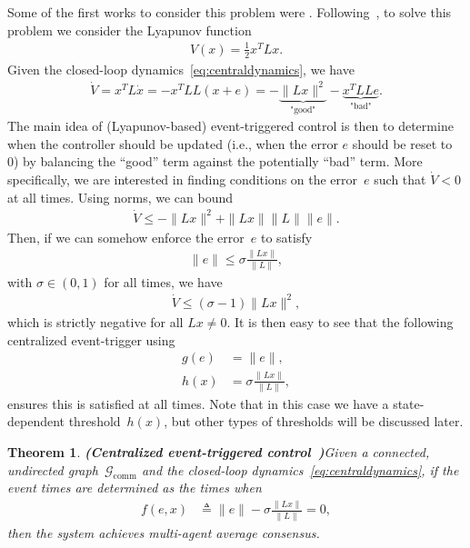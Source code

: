 \documentclass{autart}
\newtheorem{theorem}{Theorem}[section]
\newcommand{\GG}{{\mathcal{G}}}
\newcommand{\commgraph}{\GG_\text{comm}}
\newcommand{\TwoNorm}[1]{\|#1\|}
\newcommand{\longthmtitle}[1]{\mbox{}\textup{\textbf{(#1)}}}
\begin{document}
Some of the first works to consider this problem were
\cite{DVD-EF:09,DVD-KHJ:09,EK-XW-NH:10}. Following~\citep{DVD-EF-KHJ:12},
to solve this problem we consider the Lyapunov function
\begin{align*}
  V(x) = \frac{1}{2}x^T L x.
\end{align*}
Given the closed-loop dynamics~\eqref{eq:centraldynamics}, we have
\begin{align}\label{eq:lyapderivative1}
  \dot{V} = x^T L \dot{x} = -x^T L L (x + e) =
  -\underbrace{\TwoNorm{Lx}^2}_\text{"good"} - \underbrace{x^T L L
    e}_\text{"bad"} .
\end{align}
The main idea of (Lyapunov-based) event-triggered control is then to
determine when the controller should be updated (i.e., when the error
$e$ should be reset to 0) by balancing the ``good'' term against the
potentially ``bad'' term. More specifically, we are interested in
finding conditions on the error~$e$ such that $\dot{V} < 0$ at all
times. Using norms, we can bound
\begin{align*}
  \dot{V} \leq -\TwoNorm{Lx}^2 + \TwoNorm{Lx}\TwoNorm{L}\TwoNorm{e}.
\end{align*}
Then, if we can somehow enforce the error~$e$ to satisfy
\begin{align*}
  \TwoNorm{e} \leq \sigma \frac{ \TwoNorm{Lx} }{\TwoNorm{L}} ,
\end{align*}
with $\sigma \in (0,1)$ for all times, we have
\begin{align*}
  \dot{V} \leq (\sigma - 1) \TwoNorm{Lx}^2,
\end{align*}
which is strictly negative for all $Lx \neq 0$. It is then easy to see
that the following centralized event-trigger using
\begin{align*}
  g(e) &= \TwoNorm{e} , 
  \\
  h(x) &= \sigma \frac{\TwoNorm{ Lx }}{\TwoNorm{L}} ,
\end{align*}
ensures this is satisfied at all times. Note that in this case we
have a state-dependent threshold~$h(x)$, but other types of thresholds
will be discussed later.

\begin{theorem}\longthmtitle{Centralized event-triggered
    control~\citep{DVD-EF-KHJ:12}}\label{th:central} 
  Given {a connected, undirected graph~$\commgraph$ and} the
  closed-loop dynamics~\eqref{eq:centraldynamics}, if the event times
  are determined as the times when
  \begin{align}\label{eq:centraltrigger}
    f(e,x) &\triangleq \TwoNorm{e} - \sigma \frac{
      \TwoNorm{Lx}}{\TwoNorm{L}} = 0,
  \end{align}
  then the system achieves multi-agent average consensus.
\end{theorem}
\end{document}
